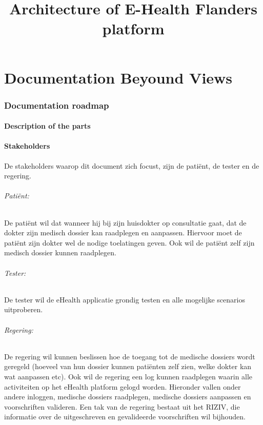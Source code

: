 \documentclass[a4paper,10pt]{article}
\title{Architecture of E-Health Flanders platform}
\author{}
\begin{document}
\maketitle

\part{Documentation Beyound Views}

\section{Documentation roadmap}

\subsection{Description of the parts}

\subsection{Stakeholders}
De stakeholders waarop dit document zich focust, zijn de patiënt, de tester en de regering.

\paragraph{Patiënt:}
De patiënt wil dat wanneer hij bij zijn huisdokter op consultatie gaat, dat de dokter zijn medisch dossier kan raadplegen en aanpassen. Hiervoor moet de patiënt zijn dokter wel de nodige toelatingen geven. Ook wil de patiënt zelf zijn medisch dossier kunnen raadplegen. 

\paragraph{Tester:}
De tester wil de eHealth applicatie grondig testen en alle mogelijke scenarios uitproberen.

\paragraph{Regering:}
De regering wil kunnen beslissen hoe de toegang tot de medische dossiers wordt geregeld (hoeveel van hun dossier kunnen patiënten zelf zien, welke dokter kan wat aanpassen etc). Ook wil de regering een log kunnen raadplegen waarin alle activiteiten op het eHealth platform gelogd worden. Hieronder vallen onder andere inloggen, medische dossiers raadplegen, medische dossiers aanpassen en voorschriften valideren. Een tak van de regering bestaat uit het RIZIV, die informatie over de uitgeschreven en gevalideerde voorschriften wil bijhouden.
\end{document}
